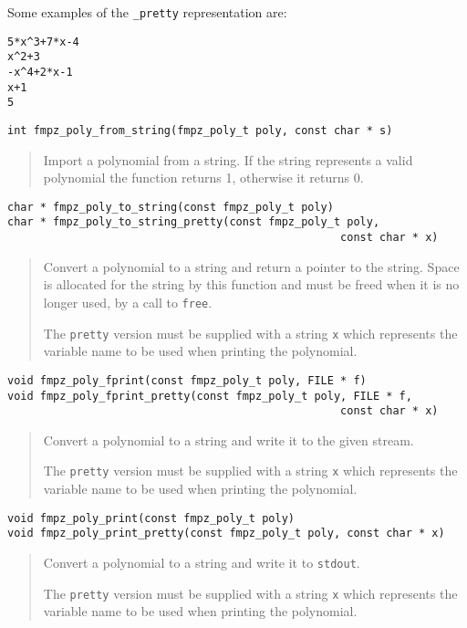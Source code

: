 \documentclass[a4paper,10pt]{article}
\newcommand{\code}{\lstinline}
\begin{document}
Some examples of the \code{_pretty} representation are:

\begin{lstlisting}
5*x^3+7*x-4
x^2+3
-x^4+2*x-1
x+1
5
\end{lstlisting}

\begin{lstlisting}
int fmpz_poly_from_string(fmpz_poly_t poly, const char * s)
\end{lstlisting}
\begin{quote}
Import a polynomial from a string. If the string represents a valid polynomial the function returns 1, otherwise it returns 0.
\end{quote}

\begin{lstlisting}
char * fmpz_poly_to_string(const fmpz_poly_t poly)
char * fmpz_poly_to_string_pretty(const fmpz_poly_t poly, 
                                                   const char * x)
\end{lstlisting}
\begin{quote}
Convert a polynomial to a string and return a pointer to the string. Space is allocated for the string by this function and must be freed when it is no longer used, by a call to \code{free}.

The \code{pretty} version must be supplied with a string \code{x} which represents the variable name to be used when printing the polynomial.
\end{quote}

\begin{lstlisting}
void fmpz_poly_fprint(const fmpz_poly_t poly, FILE * f)
void fmpz_poly_fprint_pretty(const fmpz_poly_t poly, FILE * f, 
                                                   const char * x)
\end{lstlisting}
\begin{quote}
Convert a polynomial to a string and write it to the given stream. 

The \code{pretty} version must be supplied with a string \code{x} which represents the variable name to be used when printing the polynomial.
\end{quote}

\begin{lstlisting}
void fmpz_poly_print(const fmpz_poly_t poly)
void fmpz_poly_print_pretty(const fmpz_poly_t poly, const char * x)
\end{lstlisting}
\begin{quote}
Convert a polynomial to a string and write it to \code{stdout}. 

The \code{pretty} version must be supplied with a string \code{x} which represents the variable name to be used when printing the polynomial.
\end{quote}
\end{document}
